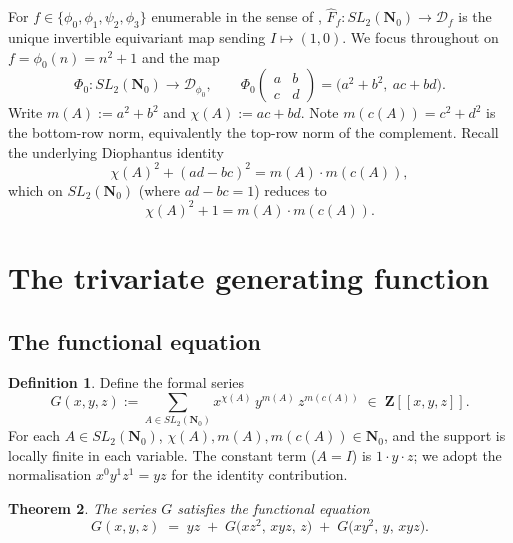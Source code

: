 \documentclass[11pt]{article}
\newtheorem{theorem}{Theorem}[section]
\theoremstyle{definition}
\newtheorem{definition}[theorem]{Definition}
\newcommand{\Nz}{\mathbf{N}_0}
\newcommand{\Z}{\mathbf{Z}}
\newcommand{\SLNz}{SL_2(\Nz)}
\newcommand{\Df}{\mathcal{D}_f}
\newcommand{\Dphi}{\mathcal{D}_{\phi_0}}
\newcommand{\Ff}{\hat{F}_f}
\newcommand{\Phzero}{\Phi_0}
\begin{document}
For $f \in \{\phi_0, \phi_1, \psi_2, \phi_3\}$ enumerable in the sense of \cite[Defn.~2.1]{shakov}, $\Ff: \SLNz \to \Df$ is the unique invertible equivariant map sending $I \mapsto (1,0)$. We focus throughout on $f = \phi_0(n) = n^2+1$ and the map
\[
\Phzero: \SLNz \to \Dphi, \qquad \Phzero \begin{pmatrix} a & b \\ c & d \end{pmatrix} = \bigl(a^2+b^2,\ ac+bd\bigr).
\]
Write $m(A) := a^2+b^2$ and $\chi(A) := ac+bd$. Note $m(c(A)) = c^2+d^2$ is the bottom-row norm, equivalently the top-row norm of the complement. Recall the underlying Diophantus identity
\[
\chi(A)^2 + (ad-bc)^2 = m(A) \cdot m(c(A)),
\]
which on $\SLNz$ (where $ad-bc = 1$) reduces to
\begin{equation}\label{eq:diophantus}
\chi(A)^2 + 1 = m(A) \cdot m(c(A)).
\end{equation}

\section{The trivariate generating function}\label{sec:genfn}

\subsection{The functional equation}

\begin{definition}\label{def:genfn}
Define the formal series
\[
G(x,y,z) := \sum_{A \in \SLNz} x^{\chi(A)}\, y^{m(A)}\, z^{m(c(A))} \;\in\; \Z[[x,y,z]].
\]
For each $A \in \SLNz$, $\chi(A), m(A), m(c(A)) \in \Nz$, and the support is locally finite in each variable. The constant term ($A = I$) is $1 \cdot y \cdot z$; we adopt the normalisation $x^0 y^1 z^1 = yz$ for the identity contribution.
\end{definition}

\begin{theorem}\label{thm:fnceq}
The series $G$ satisfies the functional equation
\begin{equation}\label{eq:fnceq}
G(x,y,z) \;=\; yz \;+\; G\bigl(xz^2,\, xyz,\, z\bigr) \;+\; G\bigl(xy^2,\, y,\, xyz\bigr).
\end{equation}
\end{theorem}
\end{document}

